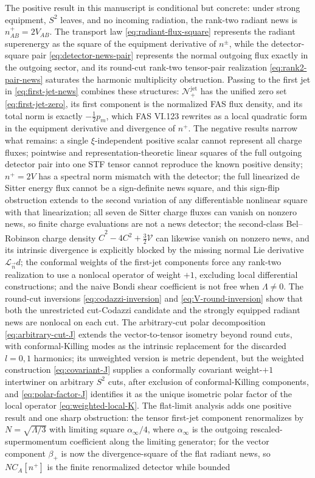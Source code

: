\documentclass[11pt,a4paper]{article}
\newcommand{\cN}{\mathcal{N}}
\newcommand{\cV}{\mathcal{V}}
\begin{document}
The positive result in this manuscript is conditional but concrete: under strong equipment, \(S^2\) leaves, and no incoming radiation, the rank-two radiant news is \(n^+_{AB}=2V_{AB}\).  The transport law \eqref{eq:radiant-flux-square} represents the radiant superenergy as the square of the equipment derivative of \(n^\pm\), while the detector-square pair \eqref{eq:detector-news-pair} represents the normal outgoing flux exactly in the outgoing sector, and its round-cut rank-two tensor-pair realization \eqref{eq:rank2-pair-news} saturates the harmonic multiplicity obstruction.  Passing to the first jet in \eqref{eq:first-jet-news} combines these structures: \(\cN^{\mathrm{jet}}_+\) has the unified zero set \eqref{eq:first-jet-zero}, its first component is the normalized FAS flux density, and its total norm is exactly \(-\tfrac12p_m\), which FAS VI.123 rewrites as a local quadratic form in the equipment derivative and divergence of \(n^+\).  The negative results narrow what remains: a single \(\xi\)-independent positive scalar cannot represent all charge fluxes; pointwise and representation-theoretic linear squares of the full outgoing detector pair into one STF tensor cannot reproduce the known positive density; \(n^+=2V\) has a spectral norm mismatch with the detector; the full linearized de Sitter energy flux cannot be a sign-definite news square, and this sign-flip obstruction extends to the second variation of any differentiable nonlinear square with that linearization; all seven de Sitter charge fluxes can vanish on nonzero news, so finite charge evaluations are not a news detector; the second-class Bel--Robinson charge density \(\hat C^2-4C^2+\tfrac32\cV\) can likewise vanish on nonzero news, and its intrinsic divergence is explicitly blocked by the missing normal Lie derivative \(\mathcal L_{\vec n}d\); the conformal weights of the first-jet components force any rank-two realization to use a nonlocal operator of weight \(+1\), excluding local differential constructions; and the naive Bondi shear coefficient is not free when \(\Lambda\neq0\).  The round-cut inversions \eqref{eq:codazzi-inversion} and \eqref{eq:V-round-inversion} show that both the unrestricted cut-Codazzi candidate and the strongly equipped radiant news are nonlocal on each cut.  The arbitrary-cut polar decomposition \eqref{eq:arbitrary-cut-J} extends the vector-to-tensor isometry beyond round cuts, with conformal-Killing modes as the intrinsic replacement for the discarded \(l=0,1\) harmonics; its unweighted version is metric dependent, but the weighted construction \eqref{eq:covariant-J} supplies a conformally covariant weight-\(+1\) intertwiner on arbitrary \(S^2\) cuts, after exclusion of conformal-Killing components, and \eqref{eq:polar-factor-J} identifies it as the unique isometric polar factor of the local operator \eqref{eq:weighted-local-K}.  The flat-limit analysis adds one positive result and one sharp obstruction: the tensor first-jet component renormalizes by \(N=\sqrt{\Lambda/3}\) with limiting square \(\alpha_\infty/4\), where \(\alpha_\infty\) is the outgoing rescaled-supermomentum coefficient along the limiting generator; for the vector component \(\beta_+\) is now the divergence-square of the flat radiant news, so \(N C_A[n^+]\) is the finite renormalized detector while bounded 
\end{document}
